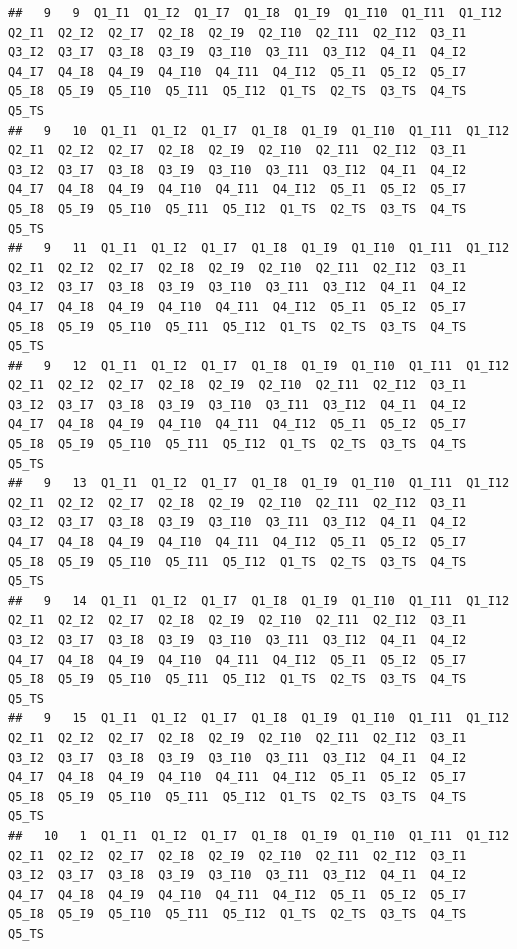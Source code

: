\documentclass[]{book}
\begin{document}
\begin{verbatim}
##   9   9  Q1_I1  Q1_I2  Q1_I7  Q1_I8  Q1_I9  Q1_I10  Q1_I11  Q1_I12  Q2_I1  Q2_I2  Q2_I7  Q2_I8  Q2_I9  Q2_I10  Q2_I11  Q2_I12  Q3_I1  Q3_I2  Q3_I7  Q3_I8  Q3_I9  Q3_I10  Q3_I11  Q3_I12  Q4_I1  Q4_I2  Q4_I7  Q4_I8  Q4_I9  Q4_I10  Q4_I11  Q4_I12  Q5_I1  Q5_I2  Q5_I7  Q5_I8  Q5_I9  Q5_I10  Q5_I11  Q5_I12  Q1_TS  Q2_TS  Q3_TS  Q4_TS  Q5_TS
##   9   10  Q1_I1  Q1_I2  Q1_I7  Q1_I8  Q1_I9  Q1_I10  Q1_I11  Q1_I12  Q2_I1  Q2_I2  Q2_I7  Q2_I8  Q2_I9  Q2_I10  Q2_I11  Q2_I12  Q3_I1  Q3_I2  Q3_I7  Q3_I8  Q3_I9  Q3_I10  Q3_I11  Q3_I12  Q4_I1  Q4_I2  Q4_I7  Q4_I8  Q4_I9  Q4_I10  Q4_I11  Q4_I12  Q5_I1  Q5_I2  Q5_I7  Q5_I8  Q5_I9  Q5_I10  Q5_I11  Q5_I12  Q1_TS  Q2_TS  Q3_TS  Q4_TS  Q5_TS
##   9   11  Q1_I1  Q1_I2  Q1_I7  Q1_I8  Q1_I9  Q1_I10  Q1_I11  Q1_I12  Q2_I1  Q2_I2  Q2_I7  Q2_I8  Q2_I9  Q2_I10  Q2_I11  Q2_I12  Q3_I1  Q3_I2  Q3_I7  Q3_I8  Q3_I9  Q3_I10  Q3_I11  Q3_I12  Q4_I1  Q4_I2  Q4_I7  Q4_I8  Q4_I9  Q4_I10  Q4_I11  Q4_I12  Q5_I1  Q5_I2  Q5_I7  Q5_I8  Q5_I9  Q5_I10  Q5_I11  Q5_I12  Q1_TS  Q2_TS  Q3_TS  Q4_TS  Q5_TS
##   9   12  Q1_I1  Q1_I2  Q1_I7  Q1_I8  Q1_I9  Q1_I10  Q1_I11  Q1_I12  Q2_I1  Q2_I2  Q2_I7  Q2_I8  Q2_I9  Q2_I10  Q2_I11  Q2_I12  Q3_I1  Q3_I2  Q3_I7  Q3_I8  Q3_I9  Q3_I10  Q3_I11  Q3_I12  Q4_I1  Q4_I2  Q4_I7  Q4_I8  Q4_I9  Q4_I10  Q4_I11  Q4_I12  Q5_I1  Q5_I2  Q5_I7  Q5_I8  Q5_I9  Q5_I10  Q5_I11  Q5_I12  Q1_TS  Q2_TS  Q3_TS  Q4_TS  Q5_TS
##   9   13  Q1_I1  Q1_I2  Q1_I7  Q1_I8  Q1_I9  Q1_I10  Q1_I11  Q1_I12  Q2_I1  Q2_I2  Q2_I7  Q2_I8  Q2_I9  Q2_I10  Q2_I11  Q2_I12  Q3_I1  Q3_I2  Q3_I7  Q3_I8  Q3_I9  Q3_I10  Q3_I11  Q3_I12  Q4_I1  Q4_I2  Q4_I7  Q4_I8  Q4_I9  Q4_I10  Q4_I11  Q4_I12  Q5_I1  Q5_I2  Q5_I7  Q5_I8  Q5_I9  Q5_I10  Q5_I11  Q5_I12  Q1_TS  Q2_TS  Q3_TS  Q4_TS  Q5_TS
##   9   14  Q1_I1  Q1_I2  Q1_I7  Q1_I8  Q1_I9  Q1_I10  Q1_I11  Q1_I12  Q2_I1  Q2_I2  Q2_I7  Q2_I8  Q2_I9  Q2_I10  Q2_I11  Q2_I12  Q3_I1  Q3_I2  Q3_I7  Q3_I8  Q3_I9  Q3_I10  Q3_I11  Q3_I12  Q4_I1  Q4_I2  Q4_I7  Q4_I8  Q4_I9  Q4_I10  Q4_I11  Q4_I12  Q5_I1  Q5_I2  Q5_I7  Q5_I8  Q5_I9  Q5_I10  Q5_I11  Q5_I12  Q1_TS  Q2_TS  Q3_TS  Q4_TS  Q5_TS
##   9   15  Q1_I1  Q1_I2  Q1_I7  Q1_I8  Q1_I9  Q1_I10  Q1_I11  Q1_I12  Q2_I1  Q2_I2  Q2_I7  Q2_I8  Q2_I9  Q2_I10  Q2_I11  Q2_I12  Q3_I1  Q3_I2  Q3_I7  Q3_I8  Q3_I9  Q3_I10  Q3_I11  Q3_I12  Q4_I1  Q4_I2  Q4_I7  Q4_I8  Q4_I9  Q4_I10  Q4_I11  Q4_I12  Q5_I1  Q5_I2  Q5_I7  Q5_I8  Q5_I9  Q5_I10  Q5_I11  Q5_I12  Q1_TS  Q2_TS  Q3_TS  Q4_TS  Q5_TS
##   10   1  Q1_I1  Q1_I2  Q1_I7  Q1_I8  Q1_I9  Q1_I10  Q1_I11  Q1_I12  Q2_I1  Q2_I2  Q2_I7  Q2_I8  Q2_I9  Q2_I10  Q2_I11  Q2_I12  Q3_I1  Q3_I2  Q3_I7  Q3_I8  Q3_I9  Q3_I10  Q3_I11  Q3_I12  Q4_I1  Q4_I2  Q4_I7  Q4_I8  Q4_I9  Q4_I10  Q4_I11  Q4_I12  Q5_I1  Q5_I2  Q5_I7  Q5_I8  Q5_I9  Q5_I10  Q5_I11  Q5_I12  Q1_TS  Q2_TS  Q3_TS  Q4_TS  Q5_TS

\end{verbatim}
\end{document}
